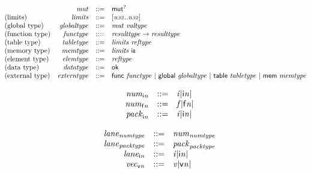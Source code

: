 $$
\begin{array}{@{}lrrl@{}l@{}}
& {\mathit{mut}} &::=& {\mathsf{mut}^?} \\
\mbox{(limits)} & {\mathit{limits}} &::=& {}[{\mathit{u{\scriptstyle32}}} .. {\mathit{u{\scriptstyle32}}}] \\
\mbox{(global type)} & {\mathit{globaltype}} &::=& {\mathit{mut}}~{\mathit{valtype}} \\
\mbox{(function type)} & {\mathit{functype}} &::=& {\mathit{resulttype}} \rightarrow {\mathit{resulttype}} \\
\mbox{(table type)} & {\mathit{tabletype}} &::=& {\mathit{limits}}~{\mathit{reftype}} \\
\mbox{(memory type)} & {\mathit{memtype}} &::=& {\mathit{limits}}~\mathsf{i{\scriptstyle8}} \\
\mbox{(element type)} & {\mathit{elemtype}} &::=& {\mathit{reftype}} \\
\mbox{(data type)} & {\mathit{datatype}} &::=& \mathsf{ok} \\
\mbox{(external type)} & {\mathit{externtype}} &::=& \mathsf{func}~{\mathit{functype}} ~|~ \mathsf{global}~{\mathit{globaltype}} ~|~ \mathsf{table}~{\mathit{tabletype}} ~|~ \mathsf{mem}~{\mathit{memtype}} \\
\end{array}
$$

\vspace{1ex}

\vspace{1ex}

\vspace{1ex}

$$
\begin{array}{@{}lrrl@{}l@{}}
& {{\mathit{num}}}_{{\mathsf{i}}{{\mathit{n}}}} &::=& {{\mathit{i}}}{{|{\mathsf{i}}{{\mathit{n}}}|}} \\
& {{\mathit{num}}}_{{\mathsf{f}}{{\mathit{n}}}} &::=& {{\mathit{f}}}{{|{\mathsf{f}}{{\mathit{n}}}|}} \\
& {{\mathit{pack}}}_{{\mathsf{i}}{{\mathit{n}}}} &::=& {{\mathit{i}}}{{|{\mathsf{i}}{{\mathit{n}}}|}} \\
\end{array}
$$

$$
\begin{array}{@{}lrrl@{}l@{}}
& {{\mathit{lane}}}_{{\mathit{numtype}}} &::=& {{\mathit{num}}}_{{\mathit{numtype}}} \\
& {{\mathit{lane}}}_{{\mathit{packtype}}} &::=& {{\mathit{pack}}}_{{\mathit{packtype}}} \\
& {{\mathit{lane}}}_{{\mathsf{i}}{{\mathit{n}}}} &::=& {{\mathit{i}}}{{|{\mathsf{i}}{{\mathit{n}}}|}} \\
& {{\mathit{vec}}}_{{\mathsf{v}}{{\mathit{n}}}} &::=& {{\mathit{v}}}{{|{\mathsf{v}}{{\mathit{n}}}|}} \\
\end{array}
$$

